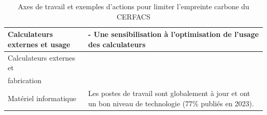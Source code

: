 \begin{table}[ht]
\begin{tabular}{|p{}|p{}|}
    \hline
    Calculateurs externes et usage & 
    - Une sensibilisation à l’optimisation de l’usage des calculateurs \\
    \hline
    Calculateurs externes et \\fabrication &  \\
    \hline
    Matériel informatique & 
    Les postes de travail sont globalement à jour et ont un bon niveau de technologie (77\% publiés en 2023). \\
    \hline
    \end{tabular}
    \caption{Axes de travail et exemples d'actions pour limiter l'empreinte carbone du CERFACS}
    \label{tab:Eco_actions}
\end{table}



